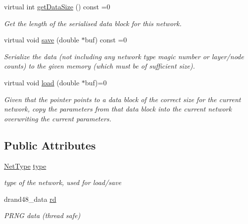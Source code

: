 \begin{DoxyCompactItemize}
virtual int \hyperlink{classNet_a18dfc4bbf338d5167e787edefef8cd43}{get\+Data\+Size} () const =0
\begin{DoxyCompactList}\small\item\em Get the length of the serialised data block for this network. \end{DoxyCompactList}\item 
virtual void \hyperlink{classNet_ad1178bdda5ebb1dc1bb57dc3da727fce}{save} (double $\ast$buf) const =0
\begin{DoxyCompactList}\small\item\em Serialize the data (not including any network type magic number or layer/node counts) to the given memory (which must be of sufficient size). \end{DoxyCompactList}\item 
virtual void \hyperlink{classNet_a6fc4cac6c8e32acc1d3567defcce9b8c}{load} (double $\ast$buf)=0
\begin{DoxyCompactList}\small\item\em Given that the pointer points to a data block of the correct size for the current network, copy the parameters from that data block into the current network overwriting the current parameters. \end{DoxyCompactList}\end{DoxyCompactItemize}
\subsection*{Public Attributes}
\begin{DoxyCompactItemize}
\item 
\hyperlink{netType_8hpp_a1526df0fc932ccf720aa26267f923213}{Net\+Type} \hyperlink{classNet_a6b6b0fb9e01f10084ce304df6d8c841d}{type}
\begin{DoxyCompactList}\small\item\em type of the network, used for load/save \end{DoxyCompactList}\item 
drand48\+\_\+data \hyperlink{classNet_a364288d09aeae0b47c5adbfb470a6c1c}{rd}
\begin{DoxyCompactList}\small\item\em P\+R\+NG data (thread safe) \end{DoxyCompactList}\end{DoxyCompactItemize}
